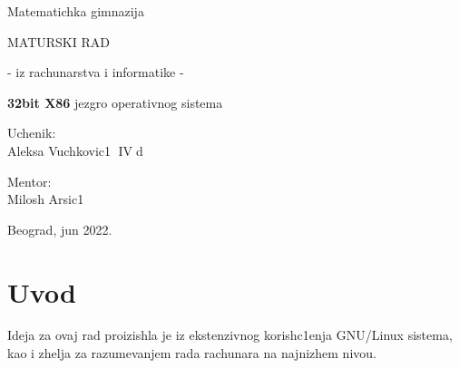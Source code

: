 \documentclass[a4paper,fleqn,12pt]{JMThesis}
\newcommand\eng{\fontencoding{OT1}\fontfamily{\rmdefault}\selectfont}
\begin{document}
\thispagestyle{empty}

\begin{center}
{\matematicka Matematichka gimnazija}
\end{center}
\vspace*{50mm}

\begin{center}
{\maturski MATURSKI RAD}

\vspace*{8pt}
{\naslov - iz rachunarstva i informatike -}
\end{center}

\vspace*{10pt}
\begin{center}
    {\naslov \textbf{\eng\Large 32bit X86} jezgro operativnog sistema}
\end{center}

\vspace*{70mm}
\setlength{\columnsep}{50pt}
\begin{multicols}{2}
 {\noindent \imen Uchenik:
\\Aleksa Vuchkovic1  $\operatorname{IV}$d}


{ \noindent \hfill \imen Mentor:\\
\hfill \phantom{aaaaaaaa} Milosh Arsic1}
\end{multicols}

\vfill
\begin{center}
{\imen Beograd, jun 2022.}
\end{center}
\clearpage

\thispagestyle{empty}
\mbox{}
\clearpage


\renewcommand{\contentsname}{Sadrzhaj}
\thispagestyle{empty}


\tableofcontents \clearpage

\thispagestyle{empty}
\mbox{}
\clearpage

\renewcommand{\chaptername}{}
\setcounter{page}{1}

\chapter{Uvod}
\bigskip

Ideja za ovaj rad proizishla je iz ekstenzivnog korish\/c1enja {\eng GNU/Linux}
sistema, kao i zhelja za razumevanjem rada rachunara na najnizhem nivou.
\end{document}
